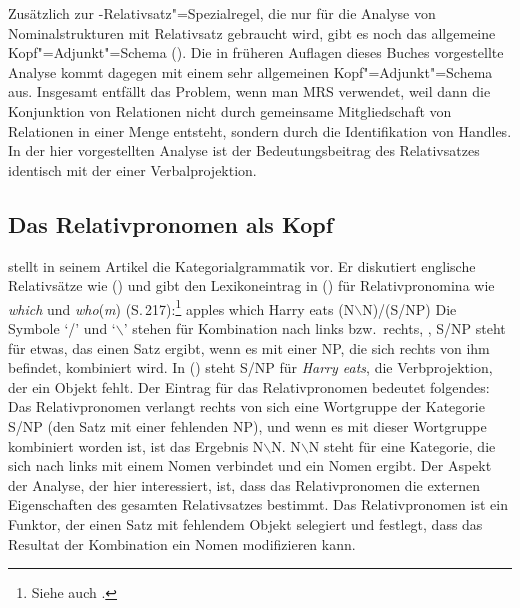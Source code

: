 Zusätzlich zur \nbar\hyp Relativsatz"=Spezialregel, die nur für die Analyse von
Nominalstrukturen mit Relativsatz gebraucht wird, gibt es noch das allgemeine
Kopf"=Adjunkt"=Schema (). Die in früheren Auflagen dieses Buches vorgestellte
Analyse kommt dagegen mit einem sehr allgemeinen Kopf"=Adjunkt"=Schema aus. Insgesamt entfällt das
Problem, wenn man MRS verwendet, weil dann die Konjunktion von Relationen nicht durch gemeinsame
Mitgliedschaft von Relationen in einer Menge entsteht, sondern durch die Identifikation von
Handles. In der hier vorgestellten Analyse ist der Bedeutungsbeitrag des Relativsatzes identisch mit
der einer Verbalprojektion.


\subsection{Das Relativpronomen als Kopf}


\citet{Steedman89a} stellt in seinem Artikel die Kategorialgrammatik vor.
Er diskutiert englische Relativsätze wie () und gibt den
Lexikoneintrag in () für Relativpronomina wie \emph{which} und \emph{who}(\emph{m})
(S.\,217):\footnote{
  Siehe auch .
}
\ea
apples which Harry eats
\z
\ea
(N$\backslash$N)/(S/NP)
\z
Die Symbole `/' und `$\backslash$' stehen für Kombination nach links bzw.\
rechts, \dash, S/NP steht für etwas, das einen Satz ergibt, wenn es mit einer NP,
die sich rechts von ihm befindet, kombiniert wird. In (\mex{0}) steht
S/NP für \emph{Harry eats}, \dash die Verbprojektion, der ein Objekt fehlt.
Der Eintrag für das Relativpronomen bedeutet folgendes: Das Relativpronomen
verlangt rechts von sich eine Wortgruppe der Kategorie S/NP (den Satz mit einer
fehlenden NP), und wenn es mit dieser Wortgruppe kombiniert worden ist, ist das
Ergebnis N$\backslash$N. N$\backslash$N steht für eine Kategorie, die sich
nach links mit einem Nomen verbindet und ein Nomen ergibt. 
Der Aspekt der Analyse, der hier interessiert, ist, dass das Relativpronomen
die externen Eigenschaften des gesamten Relativsatzes bestimmt. Das Relativpronomen
ist ein Funktor, der einen Satz mit fehlendem Objekt selegiert und festlegt,
dass das Resultat der Kombination ein Nomen modifizieren kann.

